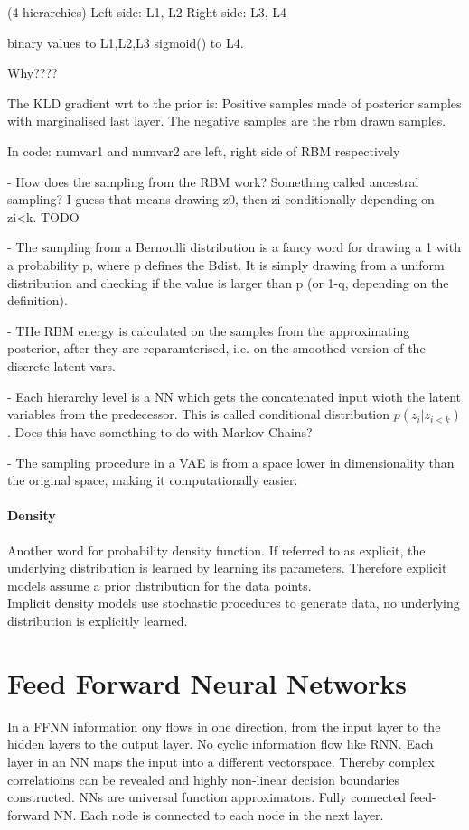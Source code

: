 (4 hierarchies) Left side: L1, L2 Right side: L3, L4

binary values to L1,L2,L3 sigmoid() to L4.

Why????

The KLD gradient wrt to the prior is: Positive samples made of posterior samples
with marginalised last layer. The negative samples are the rbm drawn samples.

In code: numvar1 and numvar2 are left, right side of RBM respectively

- How does the sampling from the RBM work? Something called ancestral sampling?
I guess that means drawing z0, then zi conditionally depending on zi<k. TODO

- The sampling from a Bernoulli distribution is a fancy word for drawing a 1
with a probability p, where p defines the Bdist. It is simply drawing from a
uniform distribution and checking if the value is larger than p (or 1-q,
depending on the definition).

- THe RBM energy is calculated on the samples from the approximating posterior,
after they are reparamterised, i.e. on the smoothed version of the discrete
latent vars. 

- Each hierarchy level is a NN which gets the concatenated input wioth the
latent variables from the predecessor. This is called conditional distribution
$p(z_i|z_{i<k})$. Does this have something to do with Markov Chains?

- The sampling procedure in a VAE is from a space lower in dimensionality than
the original space, making it computationally easier.

\paragraph{Density}
Another word for probability density function. If referred to as explicit, the
underlying distribution is learned by learning its parameters. Therefore
explicit models assume a prior distribution for the data points.\\
Implicit density models use stochastic procedures to generate data, no
underlying distribution is explicitly learned.

\cleardoublepage


\section{Feed Forward Neural Networks}
In a FFNN information ony flows in one direction, from the input layer to the
hidden layers to the output layer. No cyclic information flow like RNN. Each
layer in an NN maps the input into a different vectorspace. Thereby complex
correlatioins can be revealed and highly non-linear decision boundaries
constructed. NNs are universal function approximators. Fully connected
feed-forward NN. Each node is connected to each node in the next layer.

